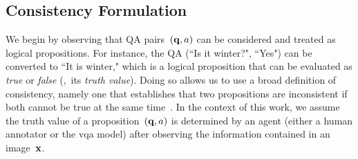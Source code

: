 \subsection{Consistency Formulation}
\label{subsec:consistency_framework}

We begin by observing that QA pairs~$(\mathbf{q}, a)$ can be considered and treated as logical propositions.
For instance, the QA (``Is it winter?", ``Yes") can be converted to ``It is winter," which is a logical proposition that can be evaluated as \emph{true} or \emph{false} (\ie,~its \emph{truth value}). Doing so allows us to use a broad definition of consistency, namely one that establishes that two propositions are inconsistent if both cannot be true at the same time~\cite{bradley1979possible}. In the context of this work, we assume the truth value of a proposition~$(\mathbf{q}, a)$ is determined by an agent (either a human annotator or the \gls{vqa} model) after observing the information contained in an image~$\mathbf{x}$. 

